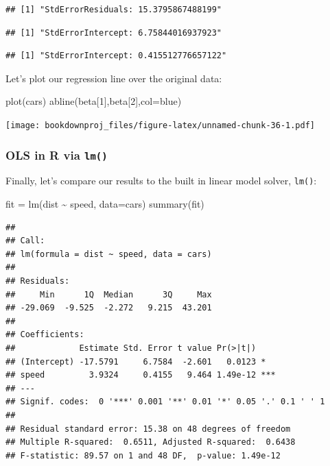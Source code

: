 \documentclass[
]{article}
\newenvironment{Shaded}{\begin{snugshade}}{\end{snugshade}}
\newcommand{\AttributeTok}[1]{\textcolor[rgb]{0.77,0.63,0.00}{#1}}
\newcommand{\DecValTok}[1]{\textcolor[rgb]{0.00,0.00,0.81}{#1}}
\newcommand{\FunctionTok}[1]{\textcolor[rgb]{0.00,0.00,0.00}{#1}}
\newcommand{\NormalTok}[1]{#1}
\newcommand{\OtherTok}[1]{\textcolor[rgb]{0.56,0.35,0.01}{#1}}
\newcommand{\SpecialCharTok}[1]{\textcolor[rgb]{0.00,0.00,0.00}{#1}}
\newcommand{\StringTok}[1]{\textcolor[rgb]{0.31,0.60,0.02}{#1}}
\theoremstyle{definition}
\theoremstyle{definition}
\theoremstyle{definition}
\theoremstyle{definition}
\theoremstyle{remark}
\begin{document}
\begin{verbatim}
## [1] "StdErrorResiduals: 15.3795867488199"
\end{verbatim}

\begin{verbatim}
## [1] "StdErrorIntercept: 6.75844016937923"
\end{verbatim}

\begin{verbatim}
## [1] "StdErrorIntercept: 0.415512776657122"
\end{verbatim}

Let's plot our regression line over the original data:

\begin{Shaded}
\begin{Highlighting}[]
\FunctionTok{plot}\NormalTok{(cars)}
\FunctionTok{abline}\NormalTok{(beta[}\DecValTok{1}\NormalTok{],beta[}\DecValTok{2}\NormalTok{],}\AttributeTok{col=}\StringTok{\textquotesingle{}blue\textquotesingle{}}\NormalTok{)}
\end{Highlighting}
\end{Shaded}

\texttt{[image: bookdownproj\_files/figure-latex/unnamed-chunk-36-1.pdf]}

\hypertarget{ols-in-r-via-lm}{%
\subsubsection{\texorpdfstring{OLS in R via \texttt{lm()}}{OLS in R via lm()}}\label{ols-in-r-via-lm}}

Finally, let's compare our results to the built in linear model solver, \texttt{lm()}:

\begin{Shaded}
\begin{Highlighting}[]
\NormalTok{fit }\OtherTok{=} \FunctionTok{lm}\NormalTok{(dist }\SpecialCharTok{\textasciitilde{}}\NormalTok{ speed, }\AttributeTok{data=}\NormalTok{cars)}
\FunctionTok{summary}\NormalTok{(fit)}
\end{Highlighting}
\end{Shaded}

\begin{verbatim}
## 
## Call:
## lm(formula = dist ~ speed, data = cars)
## 
## Residuals:
##     Min      1Q  Median      3Q     Max 
## -29.069  -9.525  -2.272   9.215  43.201 
## 
## Coefficients:
##             Estimate Std. Error t value Pr(>|t|)    
## (Intercept) -17.5791     6.7584  -2.601   0.0123 *  
## speed         3.9324     0.4155   9.464 1.49e-12 ***
## ---
## Signif. codes:  0 '***' 0.001 '**' 0.01 '*' 0.05 '.' 0.1 ' ' 1
## 
## Residual standard error: 15.38 on 48 degrees of freedom
## Multiple R-squared:  0.6511, Adjusted R-squared:  0.6438 
## F-statistic: 89.57 on 1 and 48 DF,  p-value: 1.49e-12
\end{verbatim}
\end{document}
